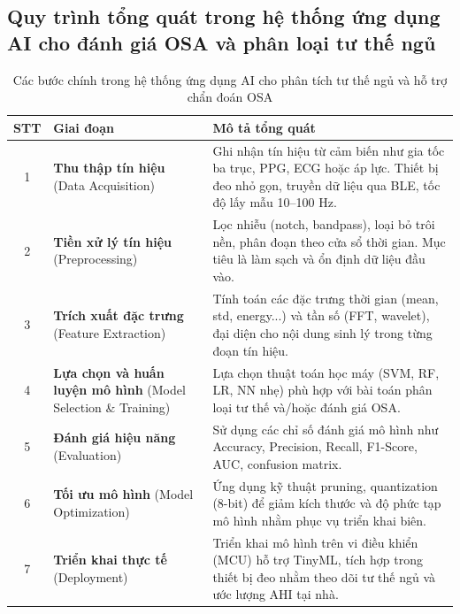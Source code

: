 \subsection{Quy trình tổng quát trong hệ thống ứng dụng AI cho đánh 
giá OSA và phân loại tư thế ngủ}
\begin{table}[htbp]
\centering
\caption{Các bước chính trong hệ thống ứng dụng AI cho phân tích tư thế ngủ và hỗ trợ chẩn đoán OSA}
\label{tab:pipeline_steps}
\small
\renewcommand{\arraystretch}{1.2}
\begin{tabular}{|c|p{3.8cm}|p{9.2cm}|}
\hline
\textbf{STT} & \textbf{Giai đoạn} & \textbf{Mô tả tổng quát} \\
\hline
1 & \textbf{Thu thập tín hiệu} \newline (Data Acquisition) & Ghi nhận tín hiệu từ cảm biến như gia tốc ba trục, PPG, ECG hoặc áp lực. Thiết bị đeo nhỏ gọn, truyền dữ liệu qua BLE, tốc độ lấy mẫu 10–100 Hz. \\
\hline
2 & \textbf{Tiền xử lý tín hiệu} \newline (Preprocessing) & Lọc nhiễu (notch, bandpass), loại bỏ trôi nền, phân đoạn theo cửa sổ thời gian. Mục tiêu là làm sạch và ổn định dữ liệu đầu vào. \\
\hline
3 & \textbf{Trích xuất đặc trưng} \newline (Feature Extraction) & Tính toán các đặc trưng thời gian (mean, std, energy...) và tần số (FFT, wavelet), đại diện cho nội dung sinh lý trong từng đoạn tín hiệu. \\
\hline
4 & \textbf{Lựa chọn và huấn luyện mô hình} \newline (Model Selection \& Training) & Lựa chọn thuật toán học máy (SVM, RF, LR, NN nhẹ) phù hợp với bài toán phân loại tư thế và/hoặc đánh giá OSA. \\
\hline
5 & \textbf{Đánh giá hiệu năng} \newline (Evaluation) & Sử dụng các chỉ số đánh giá mô hình như Accuracy, Precision, Recall, F1-Score, AUC, confusion matrix. \\
\hline
6 & \textbf{Tối ưu mô hình} \newline (Model Optimization) & Ứng dụng kỹ thuật pruning, quantization (8-bit) để giảm kích thước và độ phức tạp mô hình nhằm phục vụ triển khai biên. \\
\hline
7 & \textbf{Triển khai thực tế} \newline (Deployment) & Triển khai mô hình trên vi điều khiển (MCU) hỗ trợ TinyML, tích hợp trong thiết bị đeo nhằm theo dõi tư thế ngủ và ước lượng AHI tại nhà. \\
\hline
\end{tabular}
\end{table}


